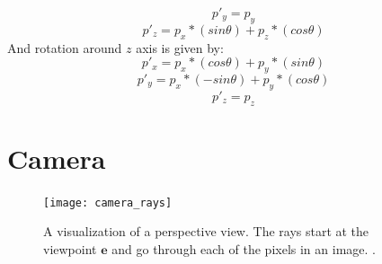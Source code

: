 \documentclass[11pt,a4paper]{article}
\begin{document}
	\begin{equation}
		p'_{y} = p_{y}
	\end{equation}
	\begin{equation}
		p'_{z} = p_{x}*(sin\theta) + p_{z}*(cos\theta)
	\end{equation}
	And rotation around $z$ axis is given by:
	\begin{equation}
		p'_{x} = p_{x}*(cos\theta) + p_{y}*(sin\theta)
	\end{equation}
	\begin{equation}
		p'_{y} = p_{x}*(-sin\theta) + p_{y}*(cos\theta)
	\end{equation}
	\begin{equation}
		p'_{z} = p_{z}
	\end{equation}
	
	\pagebreak
	\section{Camera}
	
	\begin{figure}
		\centering
		\texttt{[image: camera\_rays]} 
		\caption{A visualization of a perspective view. The rays start at the viewpoint $\boldsymbol{e}$ and go through each of the pixels in an image. \protect\cite{marschner2018fundamentals}.}
		\label{fig:wrapfig2}
	\end{figure}
	
\end{document}
